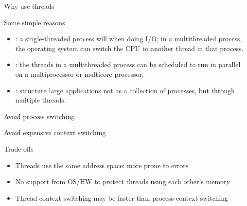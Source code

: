 \begin{slide}{Why use threads}
  \begin{block}{Some simple reasons}
    \begin{itemize}
    \item {}: a single-threaded process will  when doing I/O; in a
      multithreaded process, the operating system can switch the CPU to another thread in that process.
    \item {}: the threads in a multithreaded process can be scheduled to run in
      parallel on a multiprocessor or multicore processor.
    \item {}: structure large applications not as a collection of processes, but
      through multiple threads.
    \end{itemize}
  \end{block}
\end{slide}
\begin{slide}{Avoid process switching}
  \begin{block}{Avoid expensive context switching}
    \begin{centerfig}
    \end{centerfig}
  \end{block}
  \begin{block}{Trade-offs}
    \begin{itemize}
    \item Threads use the same address space: more prone to errors
    \item No support from OS/HW to protect threads using each other's memory
    \item Thread context switching may be faster than process context switching
    \end{itemize}
  \end{block}
\end{slide}
